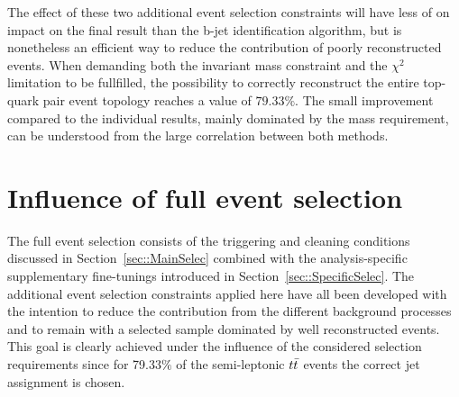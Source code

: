 The effect of these two additional event selection constraints will have less of on impact on the final result than the b-jet identification algorithm, but is nonetheless an efficient way to reduce the contribution of poorly reconstructed events.
When demanding both the invariant mass constraint and the $\chi^{2}$ limitation to be fullfilled, the possibility to correctly reconstruct the entire top-quark pair event topology reaches a value of $79.33\%$.
The small improvement compared to the individual results, mainly dominated by the mass requirement, can be understood from the large correlation between both methods.

\section{Influence of full event selection} %
The full event selection consists of the triggering and cleaning conditions discussed in Section~\ref{sec::MainSelec} combined with the analysis-specific supplementary fine-tunings introduced in Section~\ref{sec::SpecificSelec}.
The additional event selection constraints applied here have all been developed with the intention to reduce the contribution from the different background processes and to remain with a selected sample dominated by well reconstructed events.
This goal is clearly achieved under the influence of the considered selection requirements
since for 79.33$\%$ of the semi-leptonic $t\bar{t}$ events the correct jet assignment is chosen.
\\

